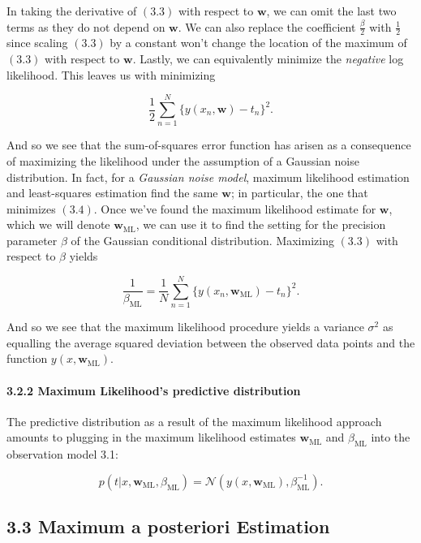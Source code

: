 \documentclass[
  0.875em,
  letterpaper,
  DIV=11,
  numbers=noendperiod]{scrartcl}
\let\oldparagraph\paragraph
\renewcommand{\paragraph}[1]{\oldparagraph{#1}\mbox{}}
\begin{document}
In taking the derivative of \((3.3)\) with respect to \(\mathbf{w}\), we
can omit the last two terms as they do not depend on \(\mathbf{w}\). We
can also replace the coefficient \(\frac{\beta}{2}\) with
\(\frac{1}{2}\) since scaling \((3.3)\) by a constant won't change the
location of the maximum of \((3.3)\) with respect to \(\mathbf{w}\).
Lastly, we can equivalently minimize the \emph{negative} log likelihood.
This leaves us with minimizing

\[
\frac{1}{2} \sum_{n=1}^N \{y(x_n, \mathbf{w}) - t_n \}^2. \tag{3.4}
\]

And so we see that the sum-of-squares error function has arisen as a
consequence of maximizing the likelihood under the assumption of a
Gaussian noise distribution. In fact, for a \emph{Gaussian noise model},
maximum likelihood estimation and least-squares estimation find the same
\(\mathbf{w}\); in particular, the one that minimizes \((3.4)\). Once
we've found the maximum likelihood estimate for \(\mathbf{w}\), which we
will denote \(\mathbf{w}_{\text{ML}}\), we can use it to find the
setting for the precision parameter \(\beta\) of the Gaussian
conditional distribution. Maximizing \((3.3)\) with respect to \(\beta\)
yields

\[
\frac{1}{\beta_{\text{ML}}} = \frac{1}{N} \sum_{n=1}^N \{y(x_n, \mathbf{w}_{\text{ML}}) - t_n \}^2. \tag{3.5}
\]

And so we see that the maximum likelihood procedure yields a variance
\(\sigma^2\) as equalling the average squared deviation between the
observed data points and the function \(y(x, \mathbf{w}_{\text{ML}})\).

\hypertarget{maximum-likelihoods-predictive-distribution}{%
\paragraph{\texorpdfstring{\textbf{3.2.2 Maximum Likelihood's predictive
distribution}}{3.2.2 Maximum Likelihood's predictive distribution}}\label{maximum-likelihoods-predictive-distribution}}

The predictive distribution as a result of the maximum likelihood
approach amounts to plugging in the maximum likelihood estimates
\(\mathbf{w}_{\text{ML}}\) and \(\beta_{\text{ML}}\) into the
observation model 3.1:

\[
p(t|x, \mathbf{w}_{\text{ML}}, \beta_{\text{ML}}) = \mathcal{N}(y(x, \mathbf{w}_{\text{ML}}), \beta^{-1}_{\text{ML}}). \tag{3.6}
\]

\hypertarget{maximum-a-posteriori-estimation}{%
\subsection{3.3 Maximum a posteriori
Estimation}\label{maximum-a-posteriori-estimation}}
\end{document}
